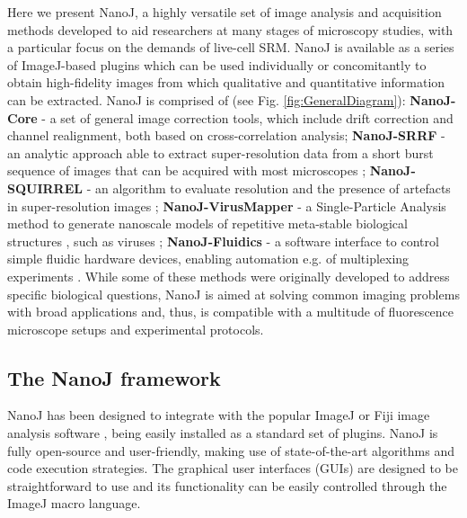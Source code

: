  Here we present NanoJ, a highly versatile set of image analysis and acquisition methods developed to aid researchers at many stages of microscopy studies, with a particular focus on the demands of live-cell SRM. NanoJ is available as a series of ImageJ-based plugins which can be used individually or concomitantly to obtain high-fidelity images from which qualitative and quantitative information can be extracted. NanoJ is comprised of (see Fig. \ref{fig:GeneralDiagram}): \textbf{NanoJ-Core} - a set of general image correction tools, which include drift correction and channel realignment, both based on cross-correlation analysis; \textbf{NanoJ-SRRF} - an analytic approach able to extract super-resolution data from a short burst sequence of images that can be acquired with most microscopes \cite{gustafsson2016fast,culley2018srrf}; \textbf{NanoJ-SQUIRREL} - an algorithm to evaluate resolution and the presence of artefacts in super-resolution images \cite{culley2018quantitative}; \textbf{NanoJ-VirusMapper} - a Single-Particle Analysis method to generate nanoscale models of repetitive meta-stable biological structures \cite{Gray2016,Gray2017}, such as viruses \cite{gray2018nanoscale}; \textbf{NanoJ-Fluidics} - a software interface to control simple fluidic hardware devices, enabling automation e.g. of multiplexing experiments \cite{almada2018automating}. While some of these methods were originally developed to address specific biological questions, NanoJ is aimed at solving common imaging problems with broad applications and, thus, is compatible with a multitude of fluorescence microscope setups and experimental protocols. 
 
\subsection*{The NanoJ framework}
 NanoJ has been designed to integrate with the popular ImageJ or Fiji image analysis software \cite{abramoff2004image,schindelin2012fiji}, being easily installed as a standard set of plugins. NanoJ is fully open-source and user-friendly, making use of state-of-the-art algorithms and code execution strategies. The graphical user interfaces (GUIs) are designed to be straightforward to use and its functionality can be easily controlled through the ImageJ macro language.

